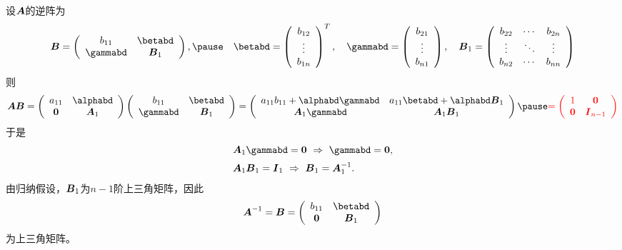 \begin{frame}
  \begin{footnotesize}
    设$\boldsymbol{A}$的逆阵为
    $$
    \B = \left(
    \begin{array}{cc}
      b_{11} & \betabd\\
      \gammabd & \B_1 
    \end{array}    
    \right), \pause 
    \quad \betabd = \left(
    \begin{array}{c}
      b_{12}\\
      \vd \\
      b_{1n}
    \end{array}
    \right)^T,
    \quad \gammabd = \left(
    \begin{array}{c}
      b_{21}\\
      \vd \\
      b_{n1}
    \end{array}
    \right), \quad
    \B_1 = \left(
    \begin{array}{ccc}
      b_{22} & \cd & b_{2n}\\
      \vd   & \dd & \vd \\
      b_{n2} & \cd & b_{nn}
    \end{array}
    \right)
    $$
    \pause
    则
    $$
    \A\B = \left(
    \begin{array}{cc}
      a_{11} & \alphabd \\
      \zero & \A_1
    \end{array}
    \right)\left(
    \begin{array}{cc}
      b_{11} & \betabd \\
      \gammabd & \B_1
    \end{array}
    \right) = \left(
    \begin{array}{cc}
      a_{11}b_{11}+\alphabd\gammabd & a_{11}\betabd+\alphabd \B_1\\
      \A_1\gammabd & \A_1\B_1
    \end{array}
    \right) \pause \red{
      = \left(
      \begin{array}{cc}
        1 & \zero \\
        \zero & \II_{n-1}
      \end{array}
      \right)
      }
    $$
    \pause
    于是
    $$
    \begin{array}{l}
      \A_1 \gammabd = \zero ~ \Rightarrow ~ \gammabd=\zero, \\[0.2cm]
      \A_1\B_1 = \II_1 ~\Rightarrow~ \B_1=\A_1^{-1}.
    \end{array}
    $$
    由归纳假设，$\boldsymbol{B}_1$为$n-1$阶上三角矩阵，因此
    $$
    \A^{-1} = \B = \left(
    \begin{array}{cc}
      b_{11} & \betabd\\
      \zero & \B_1 
    \end{array}    
    \right)
    $$
    为上三角矩阵。
  \end{footnotesize}
\end{frame}

